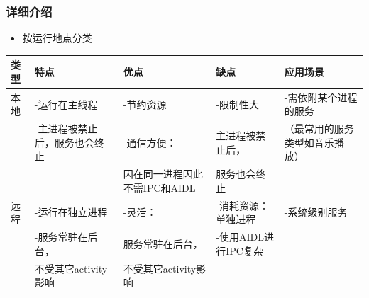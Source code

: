 \documentclass[9pt, b5paper]{article}
\begin{document}
\subsubsection{详细介绍}
\label{sec-2-5-2}
\begin{itemize}
\item 按运行地点分类
\end{itemize}
\begin{center}
\begin{tabular}{lllll}
\hline
类型 & 特点 & 优点 & 缺点 & 应用场景\\
\hline
本地 & -运行在主线程 & -节约资源 & -限制性大 & -需依附某个进程的服务\\
 & -主进程被禁止后，服务也会终止 & -通信方便： & 主进程被禁止后， & （最常用的服务类型如音乐播放）\\
 &  & 因在同一进程因此不需IPC和AIDL & 服务也会终止 & \\
\hline
远程 & -运行在独立进程 & -灵活： & -消耗资源：单独进程 & -系统级别服务\\
 & -服务常驻在后台， & 服务常驻在后台， & -使用AIDL进行IPC复杂 & \\
 & 不受其它activity影响 & 不受其它activity影响 &  & \\
\hline
\end{tabular}
\end{center}
\end{document}
